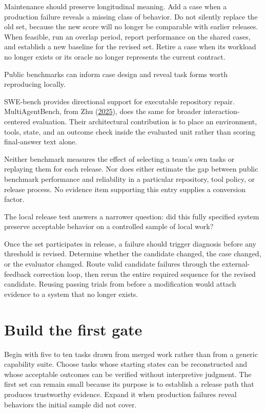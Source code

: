 Maintenance should preserve longitudinal meaning. Add a case when a production failure reveals a missing class of behavior. Do not silently replace the old set, because the new score will no longer be comparable with earlier releases. When feasible, run an overlap period, report performance on the shared cases, and establish a new baseline for the revised set. Retire a case when its workload no longer exists or its oracle no longer represents the current contract.

Public benchmarks can inform case design and reveal task forms worth reproducing locally.

SWE-bench provides directional support for executable repository repair. MultiAgentBench, from Zhu (\href{https://arxiv.org/abs/2503.01935}{2025}), does the same for broader interaction-centered evaluation. Their architectural contribution is to place an environment, tools, state, and an outcome check inside the evaluated unit rather than scoring final-answer text alone.

Neither benchmark measures the effect of selecting a team's own tasks or replaying them for each release. Nor does either estimate the gap between public benchmark performance and reliability in a particular repository, tool policy, or release process. No evidence item supporting this entry supplies a conversion factor.

The local release test answers a narrower question: did this fully specified system preserve acceptable behavior on a controlled sample of local work?

Once the set participates in release, a failure should trigger diagnosis before any threshold is revised. Determine whether the candidate changed, the case changed, or the evaluator changed. Route valid candidate failures through the external-feedback correction loop, then rerun the entire required sequence for the revised candidate. Reusing passing trials from before a modification would attach evidence to a system that no longer exists.

\hypertarget{build-the-first-gate}{%
\section{Build the first gate}\label{build-the-first-gate}}

Begin with five to ten tasks drawn from merged work rather than from a generic capability suite. Choose tasks whose starting states can be reconstructed and whose acceptable outcomes can be verified without interpretive judgment. The first set can remain small because its purpose is to establish a release path that produces trustworthy evidence. Expand it when production failures reveal behaviors the initial sample did not cover.

